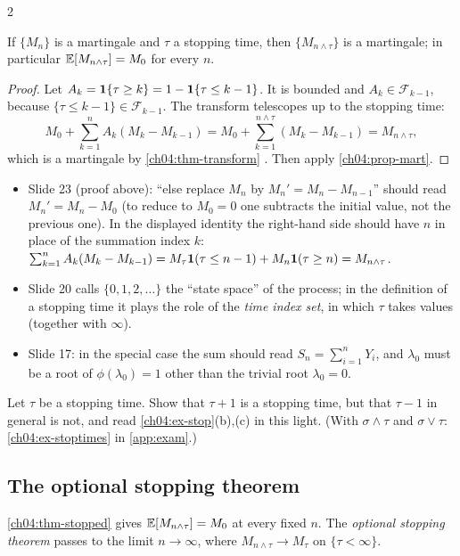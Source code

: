 \begin{paracol}{2}
\begin{theorem}\label{ch04:thm-stopped}
If $\{M_n\}$ is a martingale and $\tau$ a stopping time, then $\{M_{n\wedge\tau}\}$ is a martingale; in
particular $\mathbb{E}[M_{n\wedge\tau}]=M_0$ for every $n$.
\end{theorem}
\begin{proof}
Let $A_k=\mathbf{1}\{\tau\ge k\}=1-\mathbf{1}\{\tau\le k-1\}$. It is bounded and $A_k\in\mathcal F_{k-1}$, because
$\{\tau\le k-1\}\in\mathcal F_{k-1}$. The transform telescopes up to the stopping time:
\[
  M_0+\sum_{k=1}^nA_k(M_k-M_{k-1})=M_0+\sum_{k=1}^{n\wedge\tau}(M_k-M_{k-1})=M_{n\wedge\tau},
\]
which is a martingale by \cref{ch04:thm-transform} . Then apply \cref{ch04:prop-mart}.
\end{proof}

\begin{coursenote}
\begin{itemize}
  \item Slide 23 (proof above): ``else replace $M_n$ by $M_n'=M_n-M_{n-1}$'' should read $M_n'=M_n-M_0$ (to reduce to
        $M_0=0$ one subtracts the initial value, not the previous one). In the displayed identity the right-hand side
        should have $n$ in place of the summation index $k$:
        $\sum_{k=1}^nA_k(M_k-M_{k-1})=M_\tau\mathbf{1}(\tau\le n-1)+M_n\mathbf{1}(\tau\ge n)=M_{n\wedge\tau}$.
  \item Slide 20 calls $\{0,1,2,\dots\}$ the ``state space'' of the process; in the definition of a stopping time it
        plays the role of the \emph{time index set}, in which $\tau$ takes values (together with $\infty$).
  \item Slide 17: in the special case the sum should read $S_n=\sum_{i=1}^nY_i$, and $\lambda_0$ must be a root of
        $\phi(\lambda_0)=1$ other than the trivial root $\lambda_0=0$.
\end{itemize}
\end{coursenote}

\begin{exercise}\label{ch04:ex-stoptimes-short}
Let $\tau$ be a stopping time. Show that $\tau+1$ is a stopping time, but that $\tau-1$ in general is not, and read
\cref{ch04:ex-stop}(b),(c) in this light. (With $\sigma\wedge\tau$ and $\sigma\vee\tau$: \cref{ch04:ex-stoptimes} in
\cref{app:exam}.)
\end{exercise}

\subsection{The optional stopping theorem}
\cref{ch04:thm-stopped} gives $\mathbb{E}[M_{n\wedge\tau}]=M_0$ at every fixed $n$. The \emph{optional stopping theorem}
passes to the limit $n\to\infty$, where $M_{n\wedge\tau}\to M_\tau$ on $\{\tau<\infty\}$.


\end{paracol}
